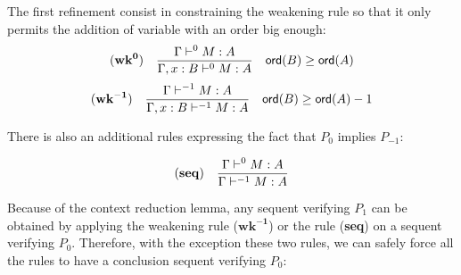 The first refinement consist in constraining the weakening rule so that
it only permits the addition of variable with an order big enough:
$$ \mathbf{(wk^{0})} \quad  \frac{\displaystyle \Gamma \vdash^{0} M : A}{\Gamma , x : B \vdash^{0} M : A} \quad {\sf ord}(B) \geq {\sf ord}(A) $$
$$ \mathbf{(wk^{-1})} \quad  \frac{\displaystyle \Gamma \vdash^{-1} M : A}{\Gamma , x : B \vdash^{-1} M : A} \quad {\sf ord}(B) \geq {\sf ord}(A) -1$$

There is also an additional rules expressing the fact that $P_0$ implies $P_{-1}$:

$$ \mathbf{(seq)} \quad \frac{\displaystyle \Gamma \vdash^{0} M : A}{\Gamma \vdash^{-1} M : A} $$


Because of the context reduction lemma, any sequent verifying $P_1$ can be obtained
by applying the weakening rule ($\mathbf{wk^{-1}}$) or the rule (\textbf{seq}) on a sequent
verifying $P_0$. Therefore, with the exception these two rules, we can safely force all the rules to
have a conclusion sequent verifying $P_0$:
